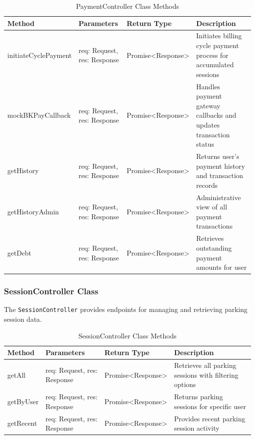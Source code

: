 \begin{table}[H]
\centering
\footnotesize
\renewcommand{\arraystretch}{1.3}
\begin{tabularx}{\textwidth}{|>{\RaggedRight\arraybackslash}X|>{\RaggedRight\arraybackslash}X|>{\RaggedRight\arraybackslash}X|>{\RaggedRight\arraybackslash}X|}
\hline
\textbf{Method} & \textbf{Parameters} & \textbf{Return Type} & \textbf{Description} \\
\hline
initiateCyclePayment & req: Request, res: Response & Promise<Response> & Initiates billing cycle payment process for accumulated sessions \\
\hline
mockBKPayCallback & req: Request, res: Response & Promise<Response> & Handles payment gateway callbacks and updates transaction status \\
\hline
getHistory & req: Request, res: Response & Promise<Response> & Returns user's payment history and transaction records \\
\hline
getHistoryAdmin & req: Request, res: Response & Promise<Response> & Administrative view of all payment transactions \\
\hline
getDebt & req: Request, res: Response & Promise<Response> & Retrieves outstanding payment amounts for user \\
\hline
\end{tabularx}
\caption{PaymentController Class Methods}
\label{tab:payment-controller-methods}
\end{table}

\subsubsection{SessionController Class}
The \texttt{SessionController} provides endpoints for managing and retrieving parking session data.

\begin{table}[H]
\centering
\footnotesize
\renewcommand{\arraystretch}{1.3}
\begin{tabularx}{\textwidth}{|>{\RaggedRight\arraybackslash}X|>{\RaggedRight\arraybackslash}X|>{\RaggedRight\arraybackslash}X|>{\RaggedRight\arraybackslash}X|}
\hline
\textbf{Method} & \textbf{Parameters} & \textbf{Return Type} & \textbf{Description} \\
\hline
getAll & req: Request, res: Response & Promise<Response> & Retrieves all parking sessions with filtering options \\
\hline
getByUser & req: Request, res: Response & Promise<Response> & Returns parking sessions for specific user \\
\hline
getRecent & req: Request, res: Response & Promise<Response> & Provides recent parking session activity \\
\hline
\end{tabularx}
\caption{SessionController Class Methods}
\label{tab:session-controller-methods}
\end{table}

